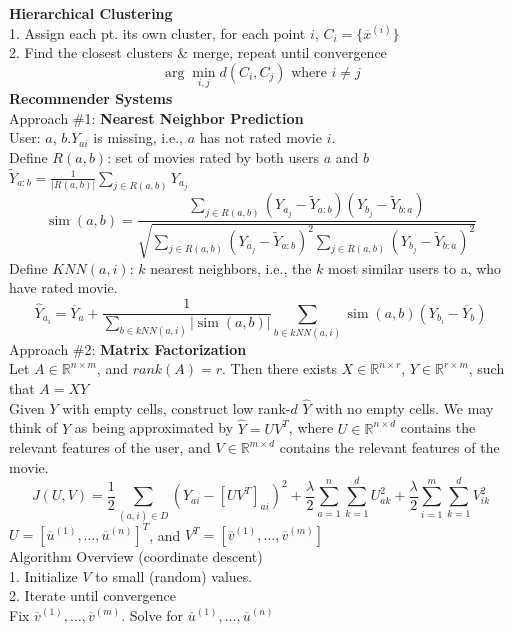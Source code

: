 \documentclass[10pt, letterpaper]{article}
\begin{document}
\begin{multicols*}{2}
\textbf{Hierarchical Clustering}\\
1. Assign each pt. its own cluster, for each point $i$, $C_i = \{\overline x^{(i)}\}$\\
2. Find the closest clusters \& merge, repeat until convergence
\[\arg \min _{i, j} d\left(C_{i}, C_{j}\right) \text { where } i \neq j\]
\textbf{Recommender Systems}\\
Approach \#1: \textbf{Nearest Neighbor Prediction}\\
User: $a$, $b$.$Y_{ai}$ is missing, i.e., $a$ has not rated movie $i$.\\
Define $R(a,b)$: set of movies rated by both users $a$ and $b$\\
$\tilde{Y}_{a : b}=\frac{1}{|R(a, b)|} \sum_{j \in R(a, b)} Y_{a_{j}}$
\[\operatorname{sim}(a, b)=\frac{\sum_{j \in R(a, b)}\left(Y_{a_{j}}-\tilde{Y}_{a : b}\right)\left(Y_{b_{j}}-\tilde{Y}_{b : a}\right)}{\sqrt{\sum_{j \in R(a, b)}\left(Y_{a_{j}}-\tilde{Y}_{a : b}\right)^{2} \sum_{j \in R(a, b)}\left(Y_{b_{j}}-\tilde{Y}_{b : a}\right)^{2}}}\]
Define $KNN(a,i)$: $k$ nearest neighbors, i.e., the $k$ most similar users to a, who have rated movie.
\[\hat{Y}_{a_{i}}=\overline{Y}_{a}+\frac{1}{\sum_{b \in k N N(a, i)}|\operatorname{sim}(a, b)|} \sum_{b \in k N N(a, i)} \operatorname{sim}(a, b)\left(Y_{b_{i}}-\overline{Y}_{b}\right)\]
Approach \#2: \textbf{Matrix Factorization}\\
Let $A\in \mathbb R^{n\times m}$, and $rank(A) = r$. Then there exists $X\in \mathbb R^{n\times r}$, $Y\in \mathbb R^{r\times m}$, such that $A = XY$\\
Given $Y$ with empty cells, construct low rank-$d$ $\widehat{Y}$ with no empty cells. We may think of $Y$ as being approximated by $\widehat{Y} = UV^T$, where $U\in \mathbb R^{n\times d}$ contains the relevant features of the user, and
$V\in \mathbb{R}^{m\times d}$ contains the relevant features of the movie.
\[J(U,V) = \frac 12 \sum_{(a,i)\in D}(Y_{ai} - [UV^T]_{ai})^2 + \frac{\lambda}2 \sum_{a = 1}^n\sum_{k=1}^dU_{ak}^2 + \frac{\lambda}2 \sum_{i = 1}^m\sum_{k=1}^dV_{ik}^2\]
$U = [\overline{u}^{(1)},\dots, \overline{u}^{(n)}]^T$, and $V^T = [\overline{v}^{(1)},\dots, \overline{v}^{(m)}]$\\
Algorithm Overview (coordinate descent)\\
1. Initialize $V$ to small (random) values.\\
2. Iterate until convergence\\
Fix $\overline{v}^{(1)},\dots,\overline{v}^{(m)}$. Solve for $\overline{u}^{(1)},\dots,\overline{u}^{(n)}$

\end{multicols*}
\end{document}
